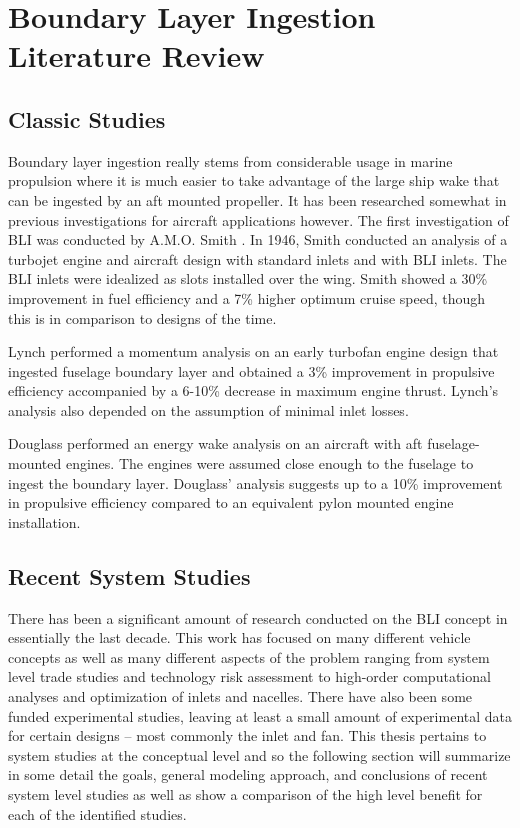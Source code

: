 \documentclass[12pt]{gatech-thesis}
\begin{document}
\section{Boundary Layer Ingestion Literature Review}
\subsection{Classic Studies}
Boundary layer ingestion really stems from considerable usage in marine propulsion where it is much easier to take advantage of the large ship wake that can be ingested by an aft mounted propeller.  It has been researched somewhat in previous investigations for aircraft applications however.  The first investigation of BLI was conducted by A.M.O. Smith \cite{Smith1947}.  In 1946, Smith conducted an analysis of a turbojet engine and aircraft design with standard inlets and with BLI inlets. The BLI inlets were idealized as slots installed over the wing.  Smith showed a 30\% improvement in fuel efficiency and a 7\% higher optimum cruise speed, though this is in comparison to designs of the time.

Lynch \cite{Lynch1960} performed a momentum analysis on an early turbofan engine design that ingested fuselage boundary layer and obtained a 3\% improvement in propulsive efficiency accompanied by a 6-10\% decrease in maximum engine thrust. Lynch’s analysis also depended on the assumption of minimal inlet losses.

Douglass \cite{Douglass1970} performed an energy wake analysis on an aircraft with aft fuselage-mounted engines. The engines were assumed close enough to the fuselage to ingest the boundary layer. Douglass’ analysis suggests up to a 10\% improvement in propulsive efficiency compared to an equivalent pylon mounted engine installation. 

\subsection{Recent System Studies}
There has been a significant amount of research conducted on the BLI concept in essentially the last decade.  This work has focused on many different vehicle concepts as well as many different aspects of the problem ranging from system level trade studies and technology risk assessment to high-order computational analyses and optimization of inlets and nacelles.  There have also been some funded experimental studies, leaving at least a small amount of experimental data for certain designs -- most commonly the inlet and fan.  This thesis pertains to system studies at the conceptual level and so the following section will summarize in some detail the goals, general modeling approach, and conclusions of recent system level studies as well as show a comparison of the high level benefit for each of the identified studies.  
\end{document}
